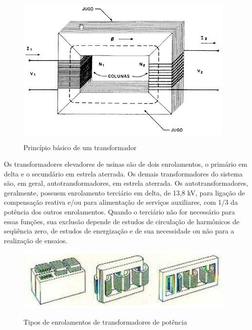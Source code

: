 \documentclass[a5paper,english,spanish,brazil]{ufsc-thesis}
\begin{document}
\begin{figure}[htb]
  \caption{Princípio básico de um transformador}
  \centering
  \includegraphics[width=10.8cm]{transformador.jpg}
  \label{fig:transformador}
\end{figure}

Os transformadores elevadores de usinas são de dois enrolamentos, o primário em delta e o secundário em estrela aterrada. Os demais transformadores do sistema são, em geral, autotransformadores, em estrela aterrada. Os autotransformadores, geralmente, possuem enrolamento terciário em delta, de 13,8 kV, para ligação de compensação reativa e/ou para alimentação de serviços auxiliares, com 1/3 da potência dos outros enrolamentos. Quando o terciário não for necessário para essas funções, sua exclusão depende de estudos de circulação de harmônicos de seqüência zero, de estudos de energização e de sua necessidade ou não para a realização de ensaios.\par

\begin{figure}[htb]
  \caption{Tipos de enrolamentos de transformadores de potência}
  \centering
  \includegraphics[width=10.8cm]{tiposdetrafo.jpg}
  \label{fig:tiposdetrafo}
\end{figure}
\end{document}
